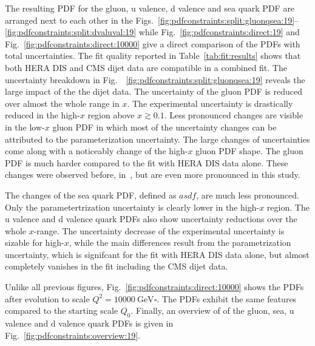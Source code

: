 The resulting PDF for the gluon, u valence, d valence and sea quark PDF are
arranged next to each other in the
Figs.~\ref{fig:pdfconstraints:split:gluonqsea:19}--\ref{fig:pdfconstraints:split:dvaluval:19}
while Fig.~\ref{fig:pdfconstraints:direct:19} and
Fig.~\ref{fig:pdfconstraints:direct:10000} give a direct comparison of the PDFs
with total uncertainties. The fit quality reported in
Table~\ref{tab:fit:results} shows that both HERA DIS and CMS dijet data are
compatible in a combined fit. The uncertainty breakdown in
Fig.~~\ref{fig:pdfconstraints:split:gluonqsea:19} reveals the large impact of
the the dijet data. The uncertainty of the gluon PDF is reduced over almost the
whole range in $x$. The experimental uncertainty is drastically reduced in the
high-$x$ region above $x \gtrsim 0.1$. Less pronounced changes are visible in
the low-$x$ gluon PDF in which most of the uncertainty changes can be attributed
to the parameterization uncertainty. The large changes of uncertainties come
along with a noticeably change of the high-$x$ gluon PDF shape. The gluon PDF is
much harder compared to the fit with HERA DIS data alone. These changes were
observed before, \eg in~\cite{Khachatryan:2014waa}, but are even more pronounced
in this study.

The changes of the sea quark PDF, defined as $asdf$, are much less pronounced.
Only the parametertrization uncertainty is clearly lower in the high-$x$ region.
The u valence and d valence quark PDFs also show uncertainty reductions over
the whole $x$-range. The uncertainty decrease of the experimental uncertainty is
sizable for high-$x$, while the main differences result from the parametrization
uncertainty, which is signifcant for the fit with HERA DIS data alone, but
almost completely vanishes in the fit including the CMS dijet data.

Unlike all previous figures, Fig.~\ref{fig:pdfconstraints:direct:10000} shows
the PDFs after evolution to scale $Q^2 = \SI{10000}{\GeV \square}$. The PDFs
exhibit the same features compared to the starting scale $Q_0$. Finally, an
overview of of the gluon, sea, u valence and d valence quark PDFs is given in
Fig.~\ref{fig:pdfconstraints:overview:19}.   

